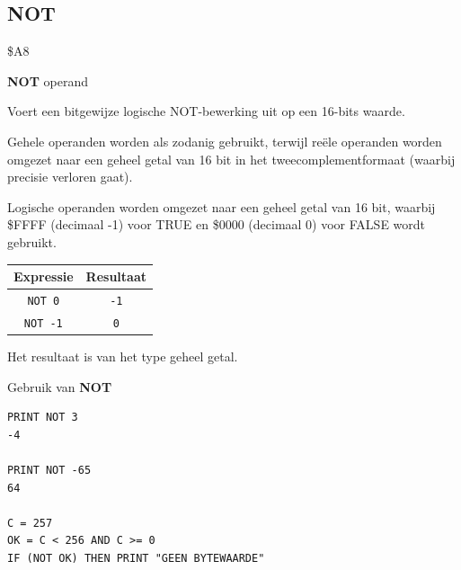 
\newpage
\subsection{NOT}
\begin{description}[leftmargin=2cm,style=nextline]
\item [Token:]    \$A8

\item [Formaat:]   {\bf NOT} operand

\item [Gebruik:]    Voert een bitgewijze logische NOT-bewerking uit op een 16-bits waarde.

                  Gehele operanden worden als zodanig gebruikt, terwijl reële operanden worden omgezet naar een geheel getal van 16 bit in het tweecomplementformaat (waarbij precisie verloren gaat).

                  Logische operanden worden omgezet naar een geheel getal van 16 bit, waarbij \$FFFF (decimaal -1) voor TRUE en \$0000 (decimaal 0) voor FALSE wordt gebruikt.

                  \begin{center}
                  \setlength{\tabcolsep}{1mm}
                     \begin{tabular}{|c|c|}
                     \hline
                        {\bf Expressie} & {\bf Resultaat}  \\
                     \hline
                        \texttt{NOT 0}  &  \texttt{-1} \\                       \texttt{NOT -1}  &  \texttt{0} \\
                     \hline
                  \end{tabular}
                  \end{center}

\item [Opmerkingen:]  Het resultaat is van het type geheel getal.

\item [Voorbeelden:] Gebruik van {\bf NOT}

\begin{tcolorbox}[colback=black,coltext=white]
\verbatimfont{\codefont}
\begin{verbatim}
PRINT NOT 3
-4

PRINT NOT -65
64

C = 257
OK = C < 256 AND C >= 0
IF (NOT OK) THEN PRINT "GEEN BYTEWAARDE"
\end{verbatim}
\end{tcolorbox}
\end{description}

